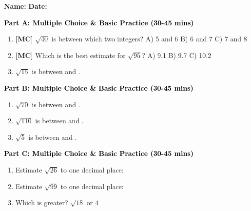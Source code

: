 \documentclass[12pt, letterpaper, fleqn]{article}
\newcommand{\blank}{\underline{\hspace{2.2cm}}}
\begin{document}
\textbf{Name:} \underline{\hspace{5cm}}
\hfill
\textbf{Date:} \underline{\hspace{3cm}}\\


\begin{tcolorbox}[colback=customteal!20]
\large\textcolor{black}{\textbf{Part A: Multiple Choice \& Basic Practice (30-45 mins)}}
\end{tcolorbox}

\vspace{3mm}

\begin{enumerate}[itemsep=2.5cm, leftmargin=0.6cm]
\item \textbf{[MC]} $\sqrt{40}$ is between which two integers?
A) 5 and 6 B) 6 and 7 C) 7 and 8
\item \textbf{[MC]} Which is the best estimate for $\sqrt{95}$?
A) 9.1 B) 9.7 C) 10.2
\item $\sqrt{15}$ is between \blank and \blank.
\end{enumerate}

\newpage

\begin{tcolorbox}[colback=customteal!20]
\large\textcolor{black}{\textbf{Part B: Multiple Choice \& Basic Practice (30-45 mins)}}
\end{tcolorbox}

\vspace{3mm}

\begin{enumerate}[itemsep=2.5cm, leftmargin=0.6cm, resume]
\item $\sqrt{70}$ is between \blank and \blank.
\item $\sqrt{110}$ is between \blank and \blank.
\item $\sqrt{5}$ is between \blank and \blank.
\end{enumerate}

\newpage

\begin{tcolorbox}[colback=customteal!20]
\large\textcolor{black}{\textbf{Part C: Multiple Choice \& Basic Practice (30-45 mins)}}
\end{tcolorbox}

\vspace{3mm}

\begin{enumerate}[itemsep=2.5cm, leftmargin=0.6cm, resume]
\item Estimate $\sqrt{26}$ to one decimal place: \blank
\item Estimate $\sqrt{99}$ to one decimal place: \blank
\item Which is greater? $\sqrt{18}$ or $4$ \blank
\end{enumerate}
\end{document}
